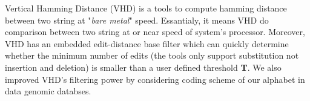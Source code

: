 Vertical Hamming Distance (VHD) is a tools to compute hamming distance between two string at "\textit{bare metal}" speed. Essantialy, it means VHD do comparison between two string at or near speed of system's processor. Moreover, VHD has an embedded edit-distance base filter which can quickly determine whether the minimum number of edits (the tools only support substitution not insertion and deletion) is smaller than a user defined threshold \textbf{T}. We also improved VHD's filtering power by considering coding scheme of our alphabet in data genomic databses.


  
  
  